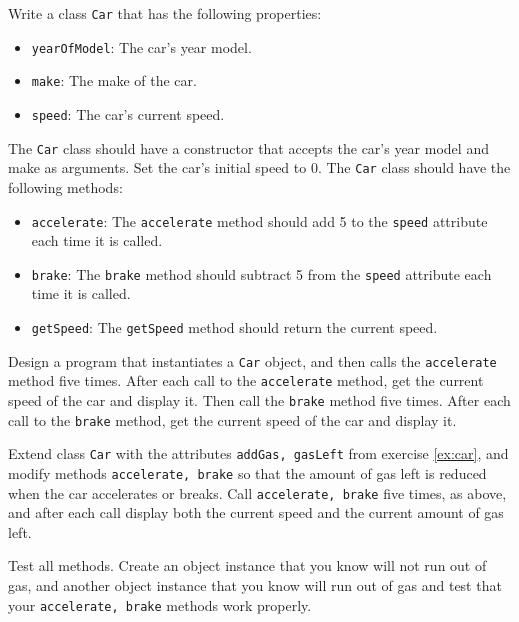 Write a class \lstinline{Car} that has the following properties:
  \begin{itemize}
  \item \lstinline{yearOfModel}: The car's year model.
  \item \lstinline{make}: The make of the car.
  \item \lstinline{speed}: The car's current speed.
  \end{itemize}
  The \lstinline{Car} class should have a constructor that accepts the car's year model and make as arguments. Set the car's initial speed to 0.  The \lstinline{Car} class should have the following methods:
  \begin{itemize}
  \item \lstinline{accelerate}: The \lstinline{accelerate} method should add 5 to the \lstinline{speed} attribute each time it is called.
  \item \lstinline{brake}: The \lstinline{brake} method should subtract 5 from the \lstinline{speed} attribute each time it is called.
  \item \lstinline{getSpeed}: The \lstinline{getSpeed} method should return the current speed.
  \end{itemize}
  Design a program that instantiates a \lstinline{Car} object, and then calls the \lstinline{accelerate} method five times. After each call to the \lstinline{accelerate} method, get the current speed of the car and display it. Then call the \lstinline{brake} method five times. After each call to the \lstinline{brake} method, get the current speed of the car and display it.

  Extend class \lstinline{Car} with the attributes \lstinline{addGas, gasLeft} from exercise \ref{ex:car}, and modify methods \lstinline{accelerate, brake} so that the amount of gas left is reduced when the car accelerates or breaks. Call \lstinline{accelerate, brake} five times, as above, and after each call display both the current speed and the current amount of gas left.

  Test all methods. Create an object instance that you know will not run out of gas, and another object instance that you know will run out of gas and test that your \lstinline{accelerate, brake} methods work properly.
